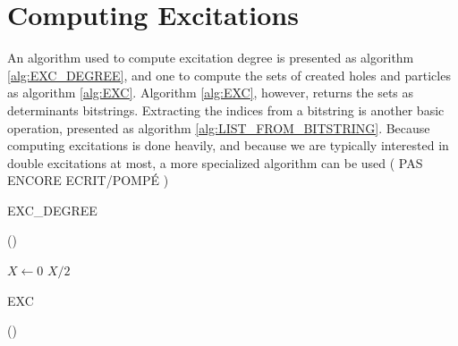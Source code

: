 \section{Computing Excitations}

An algorithm used to compute excitation degree is presented as algorithm \ref{alg:EXC_DEGREE}, and one to compute the sets of created holes and particles as algorithm \ref{alg:EXC}. Algorithm \ref{alg:EXC}, however, returns the sets as determinants bitstrings. Extracting the indices from a bitstring is another basic operation, presented as algorithm \ref{alg:LIST_FROM_BITSTRING}.
Because computing excitations is done heavily, and because we are typically interested in double excitations at most, a more specialized algorithm can be used ( PAS ENCORE ECRIT/POMPÉ )


\begin{algorithm}[h!]
	\caption{EXC\_DEGREE}
	\label{alg:EXC_DEGREE}
	
	\Fn(){}{

		$X \gets 0$   \;
		\KwRet $X / 2$\;
	}
\end{algorithm}


\begin{algorithm}[H]
	\caption{EXC}
		
	\label{alg:EXC}
	
	\Fn(){}{
		\;
		}
\end{algorithm}





